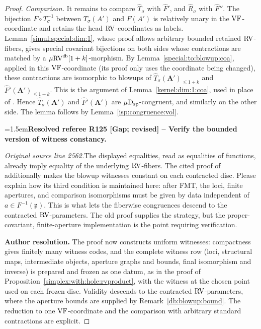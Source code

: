 \documentclass[12pt]{amsart}
\newcommand{\ResolvedRefereeRemark}[5]{%
  \par\medskip\begingroup\normalfont\small\color{gray}%
  \emergencystretch=1.5em\noindent\textbf{Resolved referee R#1 [#2] -- #3.}\par\nobreak\noindent #4\par
  \medskip\color{ResolutionGreen}\noindent\textbf{Author resolution.} #5\par
  \endgroup\medskip
}
\theoremstyle{plain}
\theoremstyle{definition}
\theoremstyle{remark}
\numberwithin{equation}{section}
\theoremstyle{plain}
\newcommand{\VF}{\textup{VF}}
\newcommand{\RV}{\textup{RV}}
\newcommand{\gp}{\mathfrak{p}}
\newcommand{\0}{\emptyset}
\newcommand{\mRV}{{\mu}{\RV}}
\newcommand{\dsp}{\textup{D}_{\textup{sp}}}
\newcommand{\mispdb}{\mu \dsp}
\DeclareMathOperator{\db}{d \! b}
\begin{document}
\begin{proof}
\emph{Comparison.} It remains to compare $\hat T_\sigma$ with $\hat F'$, and $\hat R_\sigma$ with $\hat F''$. The bijection $F \circ T_\sigma^{-1}$ between $T_\sigma(A')$ and $F(A')$ is relatively unary in the $\VF$-coordinate and retains the head $\RV$-coordinates as labels. Lemma~\ref{simul:special:dim:1}, whose proof allows arbitrary bounded retained $\RV$-fibers, gives special covariant bijections on both sides whose contractions are matched by a $\mRV^{\db}[1+k]$-morphism. By Lemma~\ref{special:to:blowup:coa}, applied in this $\VF$-coordinate (its proof only uses the coordinate being changed), these contractions are isomorphic to blowups of $\hat T_\sigma(\bm A')_{\leq 1+k}$ and $\hat F'(\bm A')_{\leq 1+k}$. This is the argument of Lemma~\ref{kernel:dim:1:coa}, used in place of \cite[Corollary~6.11]{Yin:int:acvf}. Hence $\hat T_\sigma(\bm A')$ and $\hat F'(\bm A')$ are $\mispdb$-congruent, and similarly on the other side. The lemma follows by Lemma~\ref{isp:congruence:vol}.

\ResolvedRefereeRemark{125}{Gap; revised}{Verify the bounded version of witness constancy}{%
\textit{Original source line 2562.}\quad The displayed equalities, read as equalities of functions, already imply equality of the underlying $\RV$-fibers. The cited proof of \cite[Lemma~6.14]{Yin:int:acvf} additionally makes the blowup witnesses constant on each contracted disc. Please explain how its third condition is maintained here: after FMT, the loci, finite apertures, and comparison isomorphisms must be given by data independent of $a\in F^{-1}(\gp)$. This is what lets the fiberwise congruences descend to the contracted $\RV$-parameters. The old proof supplies the strategy, but the proper-covariant, finite-aperture implementation is the point requiring verification.
}{The proof now constructs uniform witnesses: compactness gives finitely many witness codes, and the complete witness row (loci, structural maps, intermediate objects, aperture graphs and bounds, final isomorphism and inverse) is prepared and frozen as one datum, as in the proof of Proposition~\ref{simplex:with:hole:rvproduct}, with the witness at the chosen point used on each frozen disc. Validity descends to the contracted $\RV$-parameters, where the aperture bounds are supplied by Remark~\ref{db:blowup:bound}. The reduction to one $\VF$-coordinate and the comparison with arbitrary standard contractions are explicit.}
\end{proof}
\end{document}
